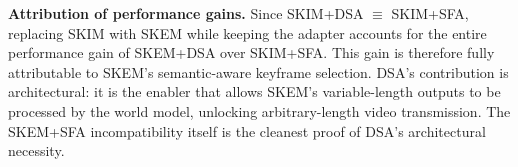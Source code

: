 \documentclass[10pt,journal]{IEEEtran}
\begin{document}
\textbf{Attribution of performance gains.}
Since SKIM+DSA $\equiv$ SKIM+SFA, replacing SKIM with SKEM while keeping the adapter accounts for the entire performance gain of SKEM+DSA over SKIM+SFA. This gain is therefore fully attributable to SKEM's semantic-aware keyframe selection. DSA's contribution is architectural: it is the enabler that allows SKEM's variable-length outputs to be processed by the world model, unlocking arbitrary-length video transmission. The SKEM+SFA incompatibility itself is the cleanest proof of DSA's architectural necessity.
\end{document}
